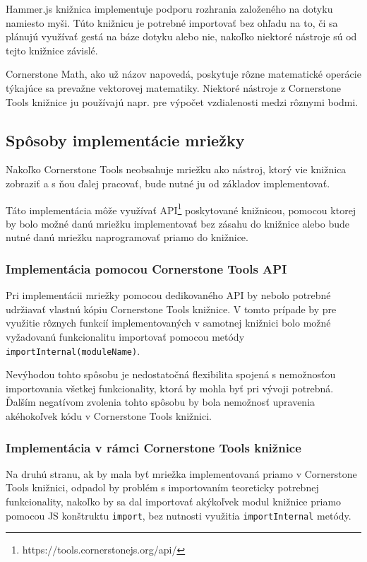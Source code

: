 Hammer.js knižnica implementuje podporu rozhrania založeného na dotyku namiesto myši. Túto knižnicu je potrebné importovať bez ohľadu na to, či sa plánujú využívať gestá na báze dotyku alebo nie, nakoľko niektoré nástroje sú od tejto knižnice závislé.

Cornerstone Math, ako už názov napovedá, poskytuje rôzne matematické operácie týkajúce sa prevažne vektorovej matematiky. Niektoré nástroje z Cornerstone Tools knižnice ju používajú napr. pre výpočet vzdialenosti medzi rôznymi bodmi.

\subsection {Spôsoby implementácie mriežky}
Nakoľko Cornerstone Tools neobsahuje mriežku ako nástroj, ktorý vie knižnica zobraziť a s ňou ďalej pracovať, bude nutné ju od základov implementovať.

Táto implementácia môže využívať API\footnote{https://tools.cornerstonejs.org/api/} poskytované knižnicou, pomocou ktorej by bolo možné danú mriežku implementovať bez zásahu do knižnice alebo bude nutné danú mriežku naprogramovať priamo do knižnice.

\subsubsection {Implementácia pomocou Cornerstone Tools API}
Pri implementácii mriežky pomocou dedikovaného API by nebolo potrebné udržiavať vlastnú kópiu Cornerstone Tools knižnice. V tomto prípade by pre využitie rôznych funkcií implementovaných v samotnej knižnici bolo možné vyžadovanú funkcionalitu importovať pomocou metódy \texttt{importInternal(moduleName)}.

Nevýhodou tohto spôsobu je nedostatočná flexibilita spojená s nemožnosťou importovania všetkej funkcionality, ktorá by mohla byť pri vývoji potrebná. Ďalším negatívom zvolenia tohto spôsobu by bola nemožnosť upravenia akéhokoľvek kódu v Cornerstone Tools knižnici.

\subsubsection {Implementácia v rámci Cornerstone Tools knižnice}
Na druhú stranu, ak by mala byť mriežka implementovaná priamo v Cornerstone Tools knižnici, odpadol by problém s importovaním teoreticky potrebnej funkcionality, nakoľko by sa dal importovať akýkoľvek modul knižnice priamo pomocou JS konštruktu \texttt{import}, bez nutnosti využitia \texttt{importInternal} metódy.

